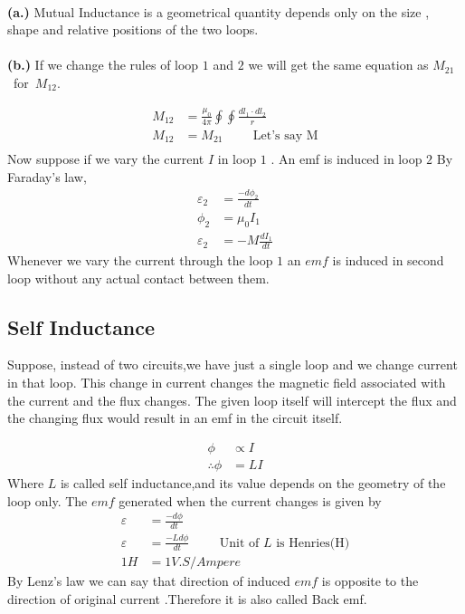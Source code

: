 \begin{note}\\
	\textbf{(a.)} 	Mutual Inductance is a geometrical quantity depends only on the size , shape and relative positions of the two loops. \\\\
	\textbf{(b.)} If we change the rules of loop $1$ and $2$ we will get the same equation as $M_{21}$\ for\ $M_{12}$.
\end{note}
\begin{align*}
M_{12}&=\frac{\mu_{0}}{4 \pi}\oint \oint \frac{dl_1 \cdot dl_2}{r}\\
M_{12}&=M_{21}\hspace{1cm} \text{Let's say  M} \\
\end{align*}
Now suppose if we vary the current $I$ in loop $1$ . An emf is induced in loop $2$ By Faraday's law,
\begin{align*}
\varepsilon_2&=\frac{-d\phi_2}{dt}\\
\phi_2&=\mu_{0}I_1\\
\varepsilon_2&= -M \frac{dI_1}{dt}
\end{align*}
Whenever we vary the current through the loop $1$ an $emf$ is induced in second loop without any actual contact between them.\\
\subsection{Self Inductance}
Suppose, instead of two circuits,we  have just a
single loop and we change current in that loop. This change in current changes the magnetic field
associated with the current and the flux changes.
The given loop itself will intercept the flux and the
changing flux would result in an emf in the circuit itself.

\begin{align*}
\phi & \propto I\\
\therefore \phi&= LI
\end{align*}
Where $L$ is called self inductance,and its value depends on the geometry of the loop only. The $emf$ generated when the current changes is given by\\
\begin{align*}
\varepsilon&=\frac{-d\phi}{dt}\\
\varepsilon&=\frac{-Ld\phi}{dt} \hspace{1cm}\text{Unit of $L$ is Henries(H)}\\
1 H&=1 V.S/Ampere
\end{align*}
By Lenz's law we can say that direction of induced $emf$ is opposite to the direction of original current .Therefore it is also called Back emf.
